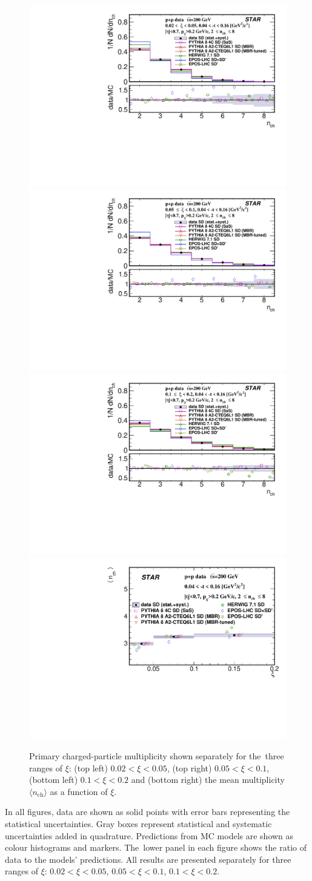 \begin{figure}[b!]
	\centering
	\includegraphics[width=.49\textwidth,page=1]{chapters/chrgSTAR/img/results/nch_ksi_0.pdf}
	\hfill
	\includegraphics[width=.49\textwidth,page=1]{chapters/chrgSTAR/img/results/nch_ksi_1.pdf}
	\newline
	\includegraphics[width=.49\textwidth,page=1]{chapters/chrgSTAR/img/results/nch_ksi_2.pdf}
	\hfill
	\includegraphics[width=.49\textwidth,page=1]{chapters/chrgSTAR/img/results/mean_nch_xi.pdf}
	\caption{Primary charged-particle multiplicity shown separately for the~three ranges of  $\xi$: (top left) $0.02<\xi<0.05$, (top right) $0.05<\xi<0.1$, (bottom left) $0.1<\xi<0.2$ and (bottom right) the mean multiplicity $\langle n_\textrm{ch}\rangle$ as a function of $\xi$.}
	\label{fig:results_star_nch}
\end{figure}
In all figures, data are shown as solid points with error bars representing the statistical uncertainties. Gray boxes represent statistical and systematic uncertainties added in quadrature. Predictions from MC models are shown as colour histograms and markers. The~lower panel in each figure shows the ratio of data to the models' predictions. All results are presented separately for three ranges of $\xi$: $0.02 < \xi<0.05$, $0.05<\xi<0.1$, $0.1<\xi<0.2$.


